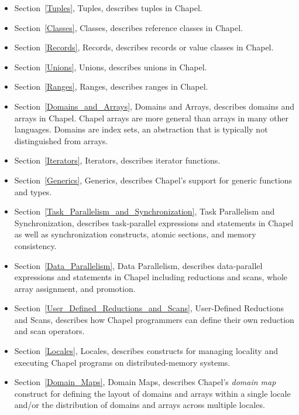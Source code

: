 \begin{itemize}
\item
Section~\ref{Tuples}, Tuples, describes tuples in Chapel.

\item
Section~\ref{Classes}, Classes, describes reference classes in Chapel.

\item
Section~\ref{Records}, Records, describes records or value classes in
Chapel.

\item
Section~\ref{Unions}, Unions, describes unions in Chapel.

\item
Section~\ref{Ranges}, Ranges, describes ranges in Chapel.

\item
Section~\ref{Domains_and_Arrays}, Domains and Arrays, describes
domains and arrays in Chapel.  Chapel arrays are more general than
arrays in many other languages.  Domains are index sets, an
abstraction that is typically not distinguished from arrays.

\item
Section~\ref{Iterators}, Iterators, describes iterator functions.

\item
Section~\ref{Generics}, Generics, describes Chapel's support for
generic functions and types.

\item
Section~\ref{Task_Parallelism_and_Synchronization}, Task Parallelism
and Synchronization, describes task-parallel expressions and
statements in Chapel as well as synchronization constructs, atomic
sections, and memory consistency.

\item
Section~\ref{Data_Parallelism}, Data Parallelism, describes
data-parallel expressions and statements in Chapel including
reductions and scans, whole array assignment, and promotion.

\item
Section~\ref{User_Defined_Reductions_and_Scans}, User-Defined
Reductions and Scans, describes how Chapel programmers can define
their own reduction and scan operators.

\item
Section~\ref{Locales}, Locales, describes constructs for managing
locality and executing Chapel programs on distributed-memory systems.

\item
Section~\ref{Domain_Maps}, Domain Maps, describes
Chapel's \emph{domain map} construct for defining the layout of
domains and arrays within a single locale and/or the distribution of
domains and arrays across multiple locales.


\end{itemize}
